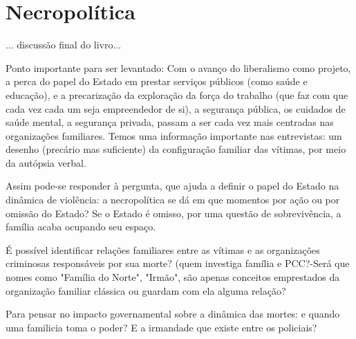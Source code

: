 \chapter{Necropolítica}

... discussão final do livro...


Ponto importante para ser levantado: Com o avanço do liberalismo como projeto, a perca do papel do Estado em prestar serviços públicos (como saúde e educação), e a precarização da exploração da força do trabalho (que faz com que cada vez cada um seja empreendedor de si), a segurança pública, os cuidados de saúde mental, a segurança privada, passam a ser cada vez mais centradas nas organizações familiares. Temos uma informação importante nas entrevistas: um desenho (precário mas suficiente) da configuração familiar das vítimas, por meio da autópsia verbal.

Assim pode-se responder à pergunta, que ajuda a definir o papel do Estado na dinâmica de violência: a necropolítica se dá em que momentos por ação ou por omissão do Estado? Se o Estado é omisso, por uma questão de sobrevivência, a família acaba ocupando seu espaço.

É possível identificar relações familiares entre as vítimas e as organizações criminosas responsáveis por sua morte? (quem investiga família e PCC?-Será que nomes como "Família do Norte", "Irmão", são apenas conceitos emprestados da organização familiar clássica ou guardam com ela alguma relação?

Para pensar no impacto governamental sobre a dinâmica das mortes: e quando uma familicia toma o poder? E a irmandade que existe entre os policiais?